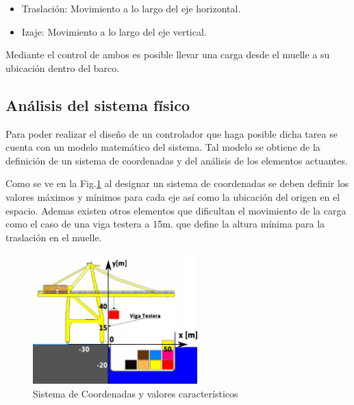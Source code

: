 \documentclass[journal]{IEEEtran}
\begin{document}
\begin{itemize}
 \item Traslación: Movimiento a lo largo del eje horizontal.
 \item Izaje: Movimiento a lo largo del eje vertical.
\end{itemize}
Mediante el control de ambos es posible llevar una
carga desde el muelle a su ubicación dentro del barco.


\subsection{Análisis del sistema físico}
\label{sec:fisica}
Para poder realizar el diseño de un controlador que
haga posible dicha tarea se cuenta con un modelo 
matemático del sistema. Tal  modelo se obtiene de la definición 
de un sistema de coordenadas y del análisis de los elementos 
actuantes.

Como se ve en la Fig.\ref{fig:ejes1} al designar un sistema de 
coordenadas se deben definir los valores máximos y mínimos 
para cada eje así como la ubicación del origen en el espacio.
Ademas existen otros elementos que dificultan el movimiento de
la carga como el caso de una viga testera a 15m. que define 
la altura mínima para la traslación en el muelle.

\begin{figure}[!t]
 \centering
  \includegraphics[width=2.5in]{EjesXY.pdf}
  \caption{Sistema de Coordenadas y valores característicos}
  \label{fig:ejes1}
\end{figure}
\end{document}
